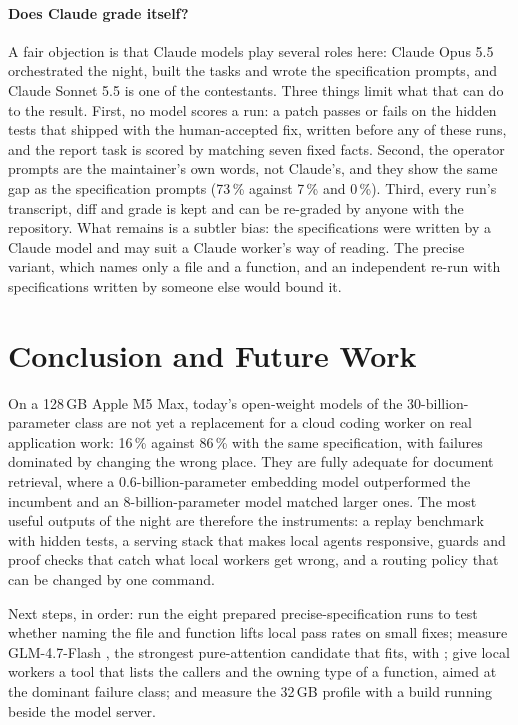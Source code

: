 \paragraph{Does Claude grade itself?} A fair objection is that Claude models play several roles here: Claude Opus 5.5
orchestrated the night, built the tasks and wrote the specification prompts, and Claude Sonnet 5.5 is one of the
contestants. Three things limit what that can do to the result. First, no model scores a run: a patch passes or fails
on the hidden tests that shipped with the human-accepted fix, written before any of these runs, and the report task is
scored by matching seven fixed facts. Second, the operator prompts are the maintainer's own words, not Claude's, and
they show the same gap as the specification prompts (73\,\% against 7\,\% and 0\,\%). Third, every run's transcript,
diff and grade is kept and can be re-graded by anyone with the repository. What remains is a subtler bias: the
specifications were written by a Claude model and may suit a Claude worker's way of reading. The precise variant, which
names only a file and a function, and an independent re-run with specifications written by someone else would bound it.

\section{Conclusion and Future Work}\label{sec:conclusion}

On a 128\,GB Apple M5 Max, today's open-weight models of the 30-billion-parameter class are not yet a replacement for
a cloud coding worker on real application work: 16\,\% against 86\,\% with the same specification, with failures
dominated by changing the wrong place. They are fully adequate for document retrieval, where a 0.6-billion-parameter
embedding model outperformed the incumbent and an 8-billion-parameter model matched larger ones. The most useful
outputs of the night are therefore the instruments: a replay benchmark with hidden tests, a serving stack that makes
local agents responsive, guards and proof checks that catch what local workers get wrong, and a routing policy that
can be changed by one command.

Next steps, in order: run the eight prepared precise-specification runs to test whether naming the file and function
lifts local pass rates on small fixes; measure GLM-4.7-Flash \citep{Zhipu-AI-2026aa}, the strongest pure-attention
candidate that fits, with ; give local workers a tool that lists the callers and the owning type
of a function, aimed at the dominant failure class; and measure the 32\,GB profile with a build running beside the
model server.

